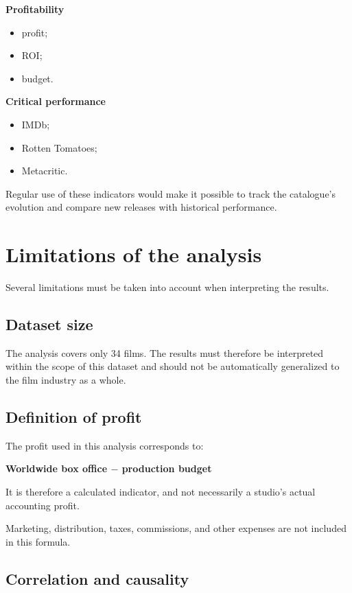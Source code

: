 \documentclass[a4paper,11pt]{article}
\begin{document}
\textbf{Profitability}
\begin{itemize}
  \item profit;
  \item ROI;
  \item budget.
\end{itemize}

\textbf{Critical performance}
\begin{itemize}
  \item IMDb;
  \item Rotten Tomatoes;
  \item Metacritic.
\end{itemize}

Regular use of these indicators would make it possible to track the
catalogue's evolution and compare new releases with historical
performance.

\section{Limitations of the analysis}

Several limitations must be taken into account when interpreting the
results.

\subsection{Dataset size}

The analysis covers only 34 films. The results must therefore be
interpreted within the scope of this dataset and should not be
automatically generalized to the film industry as a whole.

\subsection{Definition of profit}

The profit used in this analysis corresponds to:
\begin{center}
\textbf{Worldwide box office $-$ production budget}
\end{center}

It is therefore a calculated indicator, and not necessarily a studio's
actual accounting profit.

Marketing, distribution, taxes, commissions, and other expenses are
not included in this formula.

\subsection{Correlation and causality}
\end{document}
